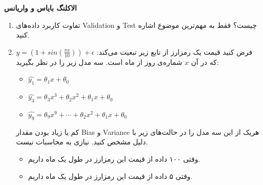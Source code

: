 \textbf{ الاکلنگ بایاس و واریانس}

\begin{enumerate}[leftmargin=17pt]
\item 
تفاوت کاربرد داده‌های Validation و Test چیست؟
فقط به مهم‌ترین موضوع اشاره کنید.
\vspace{1cm}
\item 
فرض کنید قیمت یک رمزارز از تابع زیر تبعیت می‌کند:
$y=(1+sin(\frac{\pi x}{10}))+\epsilon$
که در آن 
$x$
شماره‌ی روز از ماه است. 
سه مدل زیر را در نظر بگیرید:
{\latin
\begin{itemize}
    \item $\hat{y_1}=\theta_1 x + \theta_0$
    \item $\hat{y_3}=\theta_3 x^3 + \theta_2 x^2 + \theta_1 x + \theta_0$
    \item $\hat{y_9}=\theta_9 x^9 + \cdots + \theta_2 x^2 + \theta_1 x + \theta_0$
\end{itemize}}
کم یا زیاد بودن مقدار 
Bias
و
Variance 
هریک از این سه مدل را در حالت‌های زیر با دلیل مشخص کنید. نیازی به محاسبات نیست.
\begin{itemize}
    \item
    وقتی ۱۰۰ داده از قیمت این رمزارز در طول یک ماه داریم.
    \vspace{2cm}
    \item
    وقتی ۵ داده از قیمت این رمزارز در طول یک ماه داریم.
    \vspace{2cm}
\end{itemize}


\end{enumerate}

